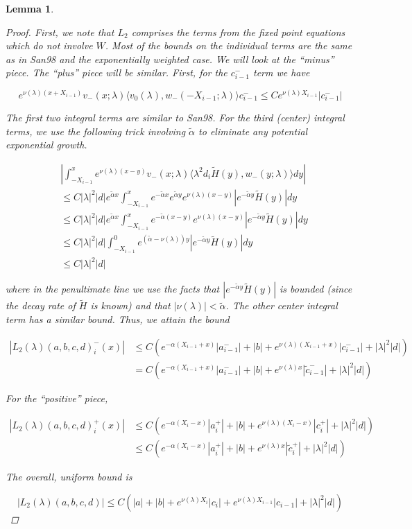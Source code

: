 \documentclass[12pt]{article}
\newtheorem{lemma}{Lemma}
\begin{document}
\begin{lemma}
\begin{proof}
First, we note that $L_2$ comprises the terms from the fixed point equations which do not involve $W$. Most of the bounds on the individual terms are the same as in San98 and the exponentially weighted case. We will look at the ``minus'' piece. The ``plus'' piece will be similar. First, for the $c_{i-1}^-$ term we have

\[
e^{\nu(\lambda)(x+X_{i-1})} v_-(x; \lambda) \langle v_0(\lambda), w_-(-X_{i-1}; \lambda) \rangle c_{i-1}^- \leq C e^{\nu(\lambda) X_{i-1} }|c_{i-1}^-|
\]

The first two integral terms are similar to San98. For the third (center) integral terms, we use the following trick involving $\tilde{\alpha}$ to eliminate any potential exponential growth.

\begin{align*}
&\left| \int_{-X_{i-1}}^x 
e^{\nu(\lambda)(x-y)} v_-(x; \lambda) \langle \lambda^2 d_i \tilde{H}(y), w_-(y; \lambda) \rangle dy \right| \\
&\leq C |\lambda|^2 |d| e^{\tilde{\alpha}x} \int_{-X_{i-1}}^x e^{-\tilde{\alpha}x} e^{\tilde{\alpha}y} e^{\nu(\lambda)(x-y)} |e^{-\tilde{\alpha}y}\tilde{H}(y)|dy \\
&\leq C |\lambda|^2 |d| e^{\tilde{\alpha}x} \int_{-X_{i-1}}^x e^{-\tilde{\alpha}(x-y)} e^{\nu(\lambda)(x-y)} |e^{-\tilde{\alpha}y}\tilde{H}(y)|dy \\
&\leq C |\lambda|^2 |d| \int_{-X_{i-1}}^0 e^{(\tilde{\alpha}-\nu(\lambda))y} |e^{-\tilde{\alpha}y}\tilde{H}(y)|dy \\
&\leq C |\lambda|^2 |d|
\end{align*}

where in the penultimate line we use the facts that $|e^{-\tilde{\alpha}y}\tilde{H}(y)|$ is bounded (since the decay rate of $\tilde{H}$ is known) and that $|\nu(\lambda)| < \tilde{\alpha}$. The other center integral term has a similar bound. Thus, we attain the bound 

\begin{align*}
|L_2(\lambda)(a,b,c,d)_i^-(x)| &\leq C (e^{-\alpha(X_{i-1} + x)}|a_{i-1}^-| + |b| + e^{\nu(\lambda)(X_{i-1} + x)} |c_{i-1}^-| + |\lambda|^2 |d| ) \\
&= C (e^{-\alpha(X_{i-1} + x)}|a_{i-1}^-| + |b| + e^{\nu(\lambda)x} |\tilde{c}_{i-1}^-| + |\lambda|^2 |d| ) 
\end{align*}

For the ``positive'' piece,

\begin{align*}
|L_2(\lambda)(a,b,c,d)_i^+(x)| &\leq C (e^{-\alpha(X_i - x)}|a_i^+| + |b| + e^{\nu(\lambda)(X_i - x)} |c_i^+| + |\lambda|^2 |d| ) \\
&\leq C (e^{-\alpha(X_i - x)}|a_i^+| + |b| + e^{\nu(\lambda)x} |\tilde{c}_i^+| + |\lambda|^2 |d| ) 
\end{align*}

The overall, uniform bound is

\[
|L_2(\lambda)(a,b,c,d)| \leq C (|a| + |b| + e^{\nu(\lambda)X_i}|c_i| + e^{\nu(\lambda)X_{i-1}}|c_{i-1}| + |\lambda|^2 |d| )
\]

\end{proof}
\end{lemma}
\end{document}
